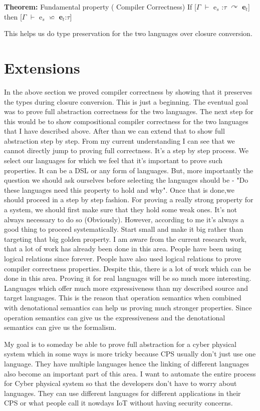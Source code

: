 \documentclass[10pt]{article}
\begin{document}
 \vskip 0.2in
 
 \textbf{Theorem:} Fundamental property ( Compiler Correctness)
 \vskip 0.2in
 If [$\Gamma$ $\vdash$ e$_s$ :$\tau$ $\curvearrowright$ \textbf{e}$_t$]
 \vskip 0.1in
 then [$\Gamma$ $\vdash$ e$_s$  $\backsimeq$ \textbf{e}$_t$:$\tau$]
 \vskip 0.1in

 This helps us do type preservation for the two languages over closure conversion.

\newpage
\section{Extensions}
In the above section we proved compiler correctness by showing that it preserves the types during closure conversion. This is just a beginning. The eventual goal was to prove full abstraction correctness for the two languages. The next step for this would be to show compositional compiler correctness for the two languages that I have described above. After than we can extend that to show full abstraction step by step.
\vskip 0.1in
From my current understanding I can see that we cannot directly jump to proving full correctness. It's a step by step process. We select our languages for which we feel that it's important to prove such properties. It can be a DSL or any form of languages. But, more importantly the question we should ask ourselves before selecting the languages should be - "Do these languages need this property to hold and why". Once that is done,we should proceed in a step by step fashion. For proving a really strong property for a system, we should first make sure that they hold some weak ones. It's not always necessary to do so (Obviously). However, according to me it's always a good thing to proceed systematically. Start small and make it big rather than targeting that big golden property. 
\vskip 0.1in
I am aware from the current research work, that a lot of work has already been done in this area. People have been using logical relations since forever. People have also used logical relations to prove compiler correctness properties. Despite this, there is a lot of work which can be done in this area. Proving it for real languages will be so much more interesting. Languages which offer much more expressiveness than my described source and target languages. This is the reason that operation semantics when combined with denotational semantics can help us proving much stronger properties. Since operation semantics can give us the expressiveness and the denotational semantics can give us the formalism. 

\vskip 0.1in
My goal is to someday be able to prove full abstraction for a cyber physical system which in some ways is more tricky because CPS usually don't just use one language. They have multiple languages hence the linking of different languages also become an important part of this area. I want to automate the entire process for Cyber physical system so that the developers don't have to worry about languages. They can use different languages for different applications in their CPS or what people call it nowdays IoT without having security concerns.  
\end{document}
